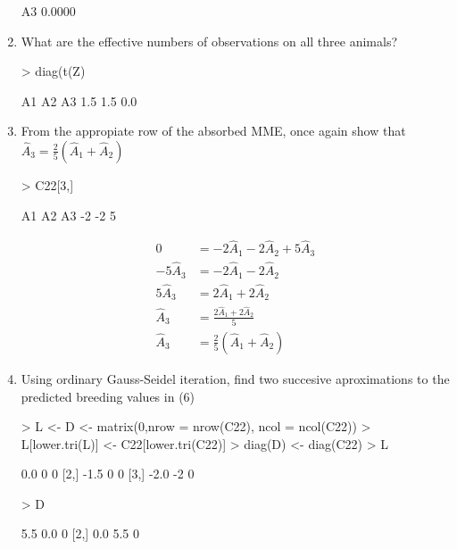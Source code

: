 \documentclass[12pt,a4paper]{paper}
\begin{document}
\begin{enumerate}
\begin{Schunk}
\begin{Soutput}
A3  0.0000
\end{Soutput}
\end{Schunk}
\item What are the effective numbers of observations on all three animals?
\begin{Schunk}
\begin{Sinput}
> diag(t(Z) %*% M %*% Z)
\end{Sinput}
\begin{Soutput}
 A1  A2  A3 
1.5 1.5 0.0 
\end{Soutput}
\end{Schunk}
\item From the appropiate row of the absorbed MME, once again show that $\hat{A}_{3} = \frac{2}{5}(\hat{A}_{1} + \hat{A}_{2})$
\begin{Schunk}
\begin{Sinput}
> C22[3,]
\end{Sinput}
\begin{Soutput}
A1 A2 A3 
-2 -2  5 
\end{Soutput}
\end{Schunk}
\begin{equation*}
\begin{split}
0 &= -2\hat{A}_1 -2\hat{A}_2 + 5\hat{A}_3 \\
-5\hat{A}_3 &= -2\hat{A}_1 - 2\hat{A}_2 \\
5\hat{A}_3 &= 2\hat{A}_1 + 2\hat{A}_2 \\
\hat{A}_3 &= \frac{2\hat{A}_1 + 2\hat{A}_2 }{5}\\
\hat{A}_3 &= \frac{2}{5}(\hat{A}_1 + \hat{A}_2)
\end{split}
\end{equation*}
\item Using ordinary Gauss-Seidel iteration, find two succesive aproximations to the predicted breeding values in (6)
\begin{Schunk}
\begin{Sinput}
> L <- D <- matrix(0,nrow = nrow(C22), ncol = ncol(C22))
> L[lower.tri(L)] <- C22[lower.tri(C22)]
> diag(D) <- diag(C22)
> L
\end{Sinput}
\begin{Soutput}
     [,1] [,2] [,3]
[1,]  0.0    0    0
[2,] -1.5    0    0
[3,] -2.0   -2    0
\end{Soutput}
\begin{Sinput}
> D
\end{Sinput}
\begin{Soutput}
     [,1] [,2] [,3]
[1,]  5.5  0.0    0
[2,]  0.0  5.5    0

\end{Soutput}
\end{Schunk}
\end{enumerate}
\end{document}
